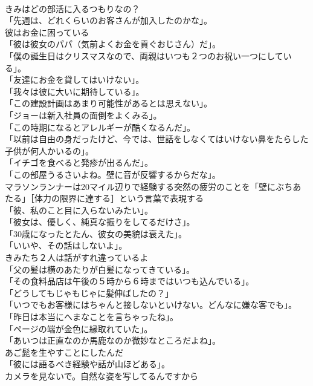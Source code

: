 \documentclass[8pt]{extreport}
\begin{document}
\begin{CJK}{UTF8}{min}
\\	きみはどの部活に入るつもりなの？	
\\	「先週は、どれくらいのお客さんが加入したのかな」。	
\\	彼はお金に困っている	
\\	「彼は彼女のパパ（気前よくお金を貢ぐおじさん）だ」。	
\\	「僕の誕生日はクリスマスなので、両親はいつも２つのお祝い一つにしている」。	
\\	「友達にお金を貸してはいけない」。	
\\	「我々は彼に大いに期待している」。	
\\	「この建設計画はあまり可能性があるとは思えない」。	
\\	「ジョーは新入社員の面倒をよくみる」。	
\\	「この時期になるとアレルギーが酷くなるんだ」。	
\\	「以前は自由の身だったけど、今では、世話をしなくてはいけない鼻をたらした子供が何人かいるの」。	
\\	「イチゴを食べると発疹が出るんだ」。	
\\	「この部屋うるさいよね。壁に音が反響するからだな」。	
\\	マラソンランナーは20マイル辺りで経験する突然の疲労のことを「壁にぶちあたる」［体力の限界に達する］という言葉で表現する	
\\	「彼、私のこと目に入らないみたい」。	
\\	「彼女は、優しく、純真な振りをしてるだけさ」。	
\\	「30歳になったとたん、彼女の美貌は衰えた」。	
\\	「いいや、その話はしないよ」。	
\\	きみたち２人は話がすれ違っているよ	
\\	「父の髪は横のあたりが白髪になってきている」。	
\\	「その食料品店は午後の５時から６時まではいつも込んでいる」。	
\\	「どうしてもじゃもじゃに髪伸ばしたの？」	
\\	「いつでもお客様にはちゃんと接しないといけない。どんなに嫌な客でも」。	
\\	「昨日は本当にへまなことを言ちゃったね」。	
\\	「ページの端が金色に縁取れていた」。	
\\	「あいつは正直なのか馬鹿なのか微妙なところだよね」。	
\\	あご髭を生やすことにしたんだ	
\\	「彼には語るべき経験や話が山ほどある」。	
\\	カメラを見ないで。自然な姿を写してるんですから	

\end{CJK}
\end{document}
